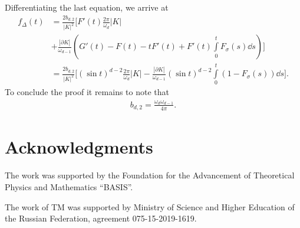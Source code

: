 \documentclass[12pt, reqno]{amsart}
\begin{document}
Differentiating the last equation, we arrive at
\begin{align*}
    f_{\Delta}(t) &= \frac{2b_{d,2}}{|K|^2} \Bigg[F'(t)\frac{2\pi}{\omega_d}|K| \\
    &+  \frac{|\partial K|}{\omega_{d-1}}\left(G'(t) - F(t) - tF'(t) + F'(t)\int\limits_0^t F_{\sigma}(s) \dd s\right) \Bigg] \\
    &= \frac{2b_{d,2}}{|K|^2} \Bigg[(\sin t)      ^{d-2}\frac{2\pi}{\omega_d}|K| -  \frac{|\partial K|}{\omega_{d-1}} (\sin t)^{d-2}\int\limits_0^t \left(1 -F_{\sigma}(s)\right) \dd s \Bigg].
\end{align*}
To conclude the proof it remains to note that 
\begin{align*}
    b_{d,2}=\frac{\omega_d\omega_{d-1}}{4\pi}.
\end{align*}

\section{Acknowledgments}
The work was supported by the Foundation for the Advancement of Theoretical Physics and Mathematics ``BASIS''.

The work of TM was supported by Ministry of Science and Higher Education of the Russian Federation, agreement  075-15-2019-1619.



\end{document}
